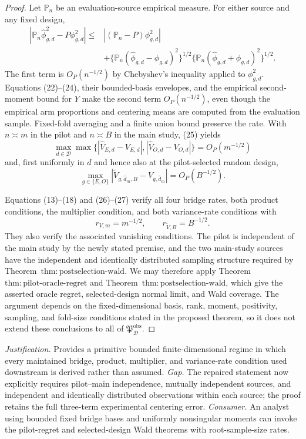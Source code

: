 \documentclass{article}
\begin{document}
\begin{proof}
Let \(\mathbb P_n\) be an evaluation-source empirical measure.  For either source and any fixed design,
\[
\begin{aligned}
 |\mathbb P_n\widehat\phi_{g,d}^2-P\phi_{g,d}^2|
 \le{}&| (\mathbb P_n-P)\phi_{g,d}^2|\\
 &+\{\mathbb P_n(\widehat\phi_{g,d}-\phi_{g,d})^2\}^{1/2}
   \{\mathbb P_n(\widehat\phi_{g,d}+\phi_{g,d})^2\}^{1/2}. \tag{25}
\end{aligned}
\]
The first term is \(O_P(n^{-1/2})\) by Chebyshev's inequality applied to \(\phi_{g,d}^2\).  Equations (22)--(24), their bounded-basis envelopes, and the empirical second-moment bound for \(Y\) make the second term \(O_P(n^{-1/2})\), even though the empirical arm proportions and centering means are computed from the evaluation sample.  Fixed-fold averaging and a finite union bound preserve the rate.  With \(n\asymp m\) in the pilot and \(n\asymp B\) in the main study, (25) yields
\[
 \max_{d\in\mathcal D}\max\bigl\{
 |\widehat V_{E,d}-V_{E,d}|,
 |\widehat V_{O,d}-V_{O,d}|\bigr\}=O_P(m^{-1/2})             \tag{26}
\]
and, first uniformly in \(d\) and hence also at the pilot-selected random design,
\[
 \max_{g\in\{E,O\}}
 |\widetilde V_{g,\widehat d_m,B}-V_{g,\widehat d_m}|
 =O_P(B^{-1/2}).                                               \tag{27}
\]

Equations (13)--(18) and (26)--(27) verify all four bridge rates, both product conditions, the multiplier condition, and both variance-rate conditions with
\[
 r_{V,m}=m^{-1/2},\qquad r_{\widetilde V,B}=B^{-1/2}.
\]
They also verify the associated vanishing conditions.  The pilot is independent of the main study by the newly stated premise, and the two main-study sources have the independent and identically distributed sampling structure required by Theorem~\(\mathrm{thm{:}postselection\text{-}wald}\).  We may therefore apply Theorem~\(\mathrm{thm{:}pilot\text{-}oracle\text{-}regret}\) and Theorem~\(\mathrm{thm{:}postselection\text{-}wald}\), which give the asserted oracle regret, selected-design normal limit, and Wald coverage.  The argument depends on the fixed-dimensional basis, rank, moment, positivity, sampling, and fold-size conditions stated in the proposed theorem, so it does not extend these conclusions to all of \(\mathfrak P_{\mathcal D}^{\mathrm{obs}}\).
\end{proof}
\par\smallskip\noindent \textit{Justification.} Provides a primitive bounded finite-dimensional regime in which every maintained bridge, product, multiplier, and variance-rate condition used downstream is derived rather than assumed. \textit{Gap.} The repaired statement now explicitly requires pilot--main independence, mutually independent sources, and independent and identically distributed observations within each source; the proof retains the full three-term experimental centering error. \textit{Consumer.} An analyst using bounded fixed bridge bases and uniformly nonsingular moments can invoke the pilot-regret and selected-design Wald theorems with root-sample-size rates.
\end{document}
